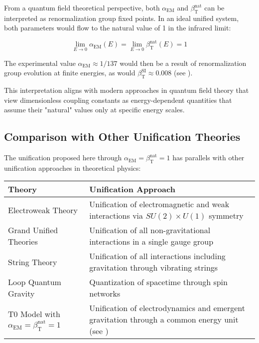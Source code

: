 \documentclass[12pt,a4paper]{article}
\newcommand{\alphaEM}{\alpha_{\text{EM}}}
\newcommand{\betaT}{\beta_{\text{T}}}
\begin{document}
	From a quantum field theoretical perspective, both \(\alphaEM\) and \(\betaT^{\text{nat}}\) can be interpreted as renormalization group fixed points. In an ideal unified system, both parameters would flow to the natural value of 1 in the infrared limit:
	
	\begin{equation}
		\lim_{E \to 0} \alphaEM(E) = \lim_{E \to 0} \betaT^{\text{nat}}(E) = 1
	\end{equation}
	
	The experimental value \(\alphaEM \approx 1/137\) would then be a result of renormalization group evolution at finite energies, as would \(\betaT^{\text{SI}} \approx 0.008\) (see \cite{pascher_erweiterung_2025}).
	
	This interpretation aligns with modern approaches in quantum field theory that view dimensionless coupling constants as energy-dependent quantities that assume their "natural" values only at specific energy scales.
	
	\subsection{Comparison with Other Unification Theories}
	\label{subsec:comparison}
	
	The unification proposed here through \(\alphaEM = \betaT^{\text{nat}} = 1\) has parallels with other unification approaches in theoretical physics:
	
	\begin{tcolorbox}[colback=blue!5!white,colframe=blue!75!black,title=Comparison with Other Unification Theories]
		\begin{tabular}{>{\raggedright\arraybackslash}p{3cm}|>{\raggedright\arraybackslash}p{8cm}}
			\textbf{Theory} & \textbf{Unification Approach} \\
			\hline
			Electroweak Theory & Unification of electromagnetic and weak interactions via \(SU(2) \times U(1)\) symmetry \\
			\hline
			Grand Unified Theories & Unification of all non-gravitational interactions in a single gauge group \\
			\hline
			String Theory & Unification of all interactions including gravitation through vibrating strings \\
			\hline
			Loop Quantum Gravity & Quantization of spacetime through spin networks \\
			\hline
			T0 Model with \(\alphaEM = \betaT^{\text{nat}} = 1\) & Unification of electrodynamics and emergent gravitation through a common energy unit (see \cite{pascher_emergente_gravitation_2025}) \\
		\end{tabular}
	\end{tcolorbox}
	
\end{document}
